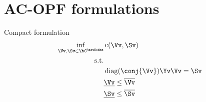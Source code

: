 \documentclass[11pt, aspectratio=169]{beamer}
\DeclareMathOperator{\diag}{diag}
\DeclareMathOperator{\cost}{c}
\begin{document}

\section{AC-OPF formulations}
\begin{frame}{Compact formulation}
\begin{align}
\inf_{\Vv,\Sv \in \bC^{\netNodes}}& \cost(\Vv,\Sv) \\
\text{s.t.} & \nonumber \\
&\diag(\conj{\Vv})\Yv\Vv = \Sv \\
& \underline{\Vv} \leq \overline{\Vv} \\
& \underline{\Sv} \leq \overline{\Sv}
\end{align}
\end{frame}
\end{document}
